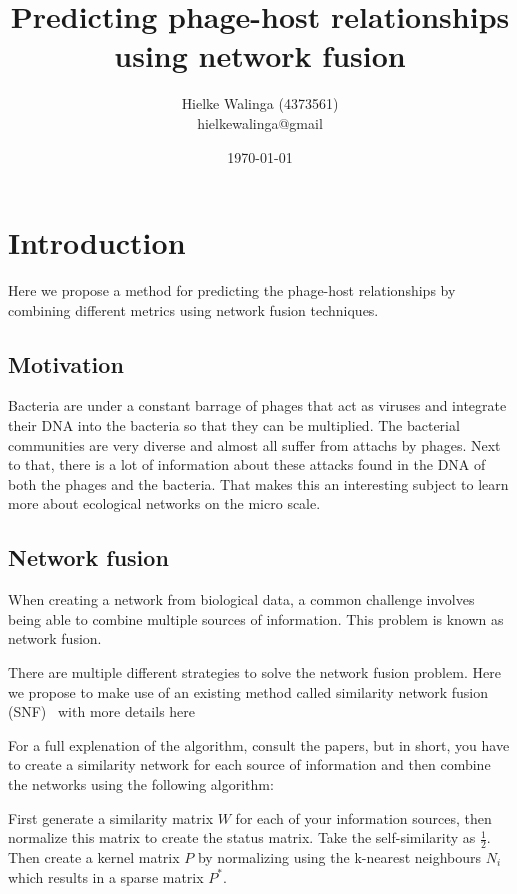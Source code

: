 \documentclass{article}
\title{Predicting phage-host relationships using network fusion}
\author{Hielke Walinga (4373561) \\ hielkewalinga@gmail}
\date{\today}
\begin{document}
\maketitle

\section{Introduction}

Here we propose a method for predicting the phage-host relationships 
by combining different metrics using network fusion techniques.

\subsection{Motivation}

Bacteria are under a constant barrage of phages that act as viruses and
integrate their DNA into the bacteria so that they can be multiplied. 
The bacterial communities are very diverse and almost all suffer from
attachs by phages. Next to that, there is a lot of information about
these attacks found in the DNA of both the phages and the bacteria. 
That makes this an interesting subject to learn more about ecological 
networks on the micro scale.

\subsection{Network fusion}

When creating a network from biological data, a common challenge involves
being able to combine multiple sources of information. This problem is
known as network fusion. 

There are multiple different strategies to solve the network fusion problem. 
Here we propose to make use of an existing method called 
similarity network fusion (SNF)~\cite{wang2014similarity}
with more details here~\cite{wang2012unsupervised}

For a full explenation of the algorithm,
consult the papers, but in short, you have to create a similarity network
for each source of information and then combine the networks using the 
following algorithm:

First generate a similarity matrix $W$ for each of your information sources, 
then normalize this matrix to create the status matrix.
Take the self-similarity as $\frac{1}{2}$.
Then create a kernel matrix $P$ 
by normalizing using the k-nearest neighbours $N_i$ which 
results in a sparse matrix $P^*$.
\end{document}
